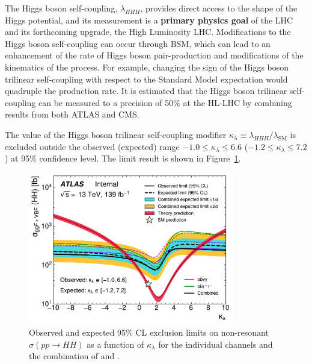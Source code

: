 \documentclass[twoside,11pt]{report}
\begin{document}
    The Higgs boson self-coupling, $\lambda_{HHH}$, provides 
    direct access to the shape of the Higgs potential, and its measurement is a \textbf{primary physics goal} of 
    the LHC and its forthcoming upgrade, the High Luminosity LHC.
    Modifications to the Higgs boson self-coupling can 
    occur through BSM, which can lead to an enhancement of the rate of Higgs boson 
    pair-production and modifications of the kinematics of the process. 
    For example, changing the sign of the Higgs boson trilinear self-coupling with respect to the 
    Standard Model expectation would quadruple the \HH production rate. It is estimated 
    that the Higgs boson trilinear self-coupling can be measured to a 
    precision of 50\% at the HL-LHC by combining results from both ATLAS and CMS. 
    
    The value of the Higgs boson trilinear self-coupling modifier 
    $\kappa_{\lambda} \equiv \lambda_{HHH}/\lambda_{\mathrm{SM}}$ is excluded outside the observed (expected) range 
    $-1.0 \le \kappa_{\lambda} \le 6.6$ ($-1.2 \le \kappa_{\lambda} \le 7.2$) 
    at 95\% confidence level. The limit result is shown in Figure~\ref{fig:kl_scan_combined}.
    \newline
    \begin{figure}[htbp]
        \centering
        \includegraphics[width=0.8\textwidth]{DiHiggs/plots/kl_scan/20210926/all_channels_kl_scan_mH125.pdf}
        \caption{Observed and expected 95\% CL exclusion limits on non-resonant $\sigma(pp \rightarrow HH)$ 
        as a function of $\kappa_\lambda$ for the individual channels and the combination of \bbtt and \bbyy.
        }
        \label{fig:kl_scan_combined}
    \end{figure}   
\end{document}
